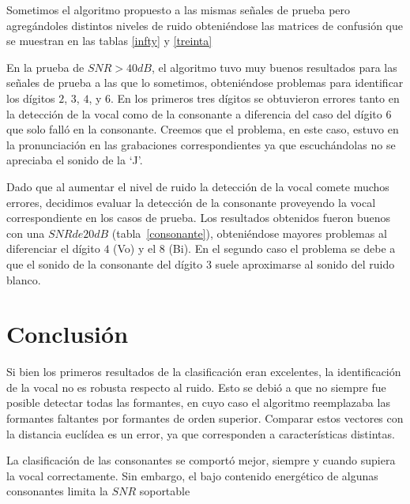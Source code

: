 \documentclass[conference,a4paper,10pt,oneside,final]{tfmpd}
\begin{document}
Sometimos el algoritmo propuesto a las mismas señales de prueba pero
agregándoles distintos niveles de ruido obteniéndose las matrices de
confusión que se muestran en las tablas \ref{infty} y \ref{treinta}

En la prueba de $SNR > 40 dB$, el algoritmo tuvo muy buenos resultados
para las señales de prueba a las que lo sometimos, obteniéndose
problemas para identificar los dígitos $2$, $3$, $4$, y $6$. En los primeros tres
dígitos se obtuvieron errores tanto en la detección de la vocal como
de la consonante a diferencia del caso del dígito $6$ que solo falló
en la consonante. Creemos que el problema, en este caso, estuvo en la
pronunciación en las grabaciones correspondientes ya que escuchándolas
no se apreciaba el sonido de la `J'.

Dado que al aumentar el nivel de ruido la detección de la vocal
comete muchos errores, decidimos evaluar la detección de la consonante
proveyendo la vocal correspondiente en los casos de prueba. Los resultados
obtenidos fueron buenos con una $SNR de 20 dB$ (tabla~\ref{consonante}), obteniéndose mayores
problemas al diferenciar  el dígito $4$ (Vo) y el $8$ (Bi). En el segundo
caso el problema se debe a que el sonido de la consonante del dígito
$3$ suele aproximarse al sonido del ruido blanco.

\section{Conclusión}

Si bien los primeros resultados de la clasificación eran excelentes,
la identificación de la vocal no es robusta respecto al ruido.
Esto se debió a que no siempre fue posible detectar todas las formantes,
en cuyo caso el algoritmo reemplazaba las formantes faltantes por formantes de orden superior.
Comparar estos vectores con la distancia euclídea es un error, ya que corresponden a características
distintas.

La clasificación de las consonantes se comportó mejor, siempre y cuando supiera la vocal correctamente.
Sin embargo, el bajo contenido energético de algunas consonantes limita la $SNR$ soportable





\nocite{*}  
\end{document}
